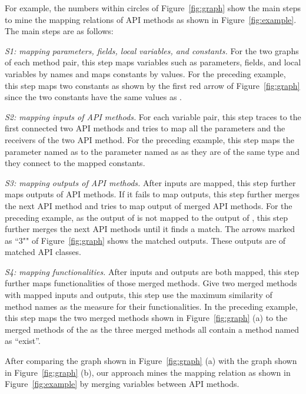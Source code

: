For example, the numbers within circles of Figure~\ref{fig:graph}
show the main steps to mine the mapping relations of API methods as
shown in Figure~\ref{fig:example}. The main steps are as follows:

\emph{S1: mapping parameters, fields, local variables, and
constants.} For the two graphs of each method pair, this step maps
variables such as parameters, fields, and local variables by names
and maps constants by values. For the preceding example, this step
maps two constants as shown by the first red arrow of
Figure~\ref{fig:graph} since the two constants have the same values
as .

\emph{S2: mapping inputs of API methods.} For each variable pair,
this step traces to the first connected two API methods and tries to
map all the parameters and the receivers of the two API method. For
the preceding example, this step maps the parameter named as
 to the parameter named as  as they
are of the same type and they connect to the mapped constants.

\emph{S3: mapping outputs of API methods.} After inputs are mapped,
this step further maps outputs of API methods. If it fails to map
outputs, this step further merges the next API method and tries to
map output of merged API methods. For the preceding example, as the
output of  is not mapped to the output
of , this step further merges the next
API methods until it finds a match. The arrows marked as ``3"" of
Figure~\ref{fig:graph} shows the matched outputs. These outputs are
of matched API classes.

\emph{S4: mapping functionalities.} After inputs and outputs are
both mapped, this step further maps functionalities of those merged
methods. Give two merged methods with mapped inputs and outputs,
this step use the maximum similarity of method names as the measure
for their functionalities. In the preceding example, this step maps
the two merged methods shown in Figure~\ref{fig:graph} (a) to the
merged methods of the  as the three
merged methods all contain a method named as ``exist''.

After comparing the graph shown in Figure~\ref{fig:graph} (a) with
the graph shown in Figure~\ref{fig:graph} (b), our approach mines
the mapping relation as shown in Figure~\ref{fig:example} by merging
variables between API methods.

